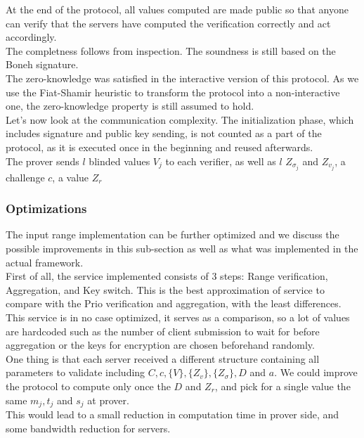 \documentclass{article}
\begin{document}
At the end of the protocol, all values computed are made public so that anyone can verify that the servers have computed the verification correctly and act accordingly.\\

The completness follows from inspection. The soundness is still based on the Boneh signature.\\
The zero-knowledge was satisfied in the interactive version of this protocol. As we use the Fiat-Shamir heuristic \cite{fiatshamir} to transform the protocol into a  non-interactive one, the zero-knowledge property is still assumed to hold.\\

Let's now look at the communication complexity.
The initialization phase, which includes signature and public key sending, is not counted as a part of the protocol, as it is executed once in the beginning and reused afterwards.\\
The prover sends $l$ blinded values $V_j$ to each verifier, as well as $l$ $Z_{\sigma_j}$ and $Z_{v_j}$, a challenge $c$, a value $Z_r$

\subsubsection*{Optimizations}
The input range implementation can be further optimized and we discuss the possible improvements in this sub-section as well as what was implemented in the actual framework.\\
First of all, the service implemented consists of 3 steps: Range verification, Aggregation, and Key switch. This is the best approximation of service to compare with the Prio verification and aggregation, with the least differences.\\
This service is in no case optimized, it serves as a comparison, so a lot of values are hardcoded such as the number of client submission to wait for before aggregation or the keys for encryption are chosen beforehand randomly.\\

One thing is that each server received a different structure containing all parameters to validate including $C, c, \{V\}, \{Z_v\} ,\{ Z_{\sigma}\}, D $ and $a$. We could improve the protocol to compute only once the $D$ and $Z_r$, and pick for a single value the same $m_j, t_j$ and $s_j$ at prover.\\
This would lead to a small reduction in computation time in prover side, and some bandwidth reduction for servers.
\end{document}
